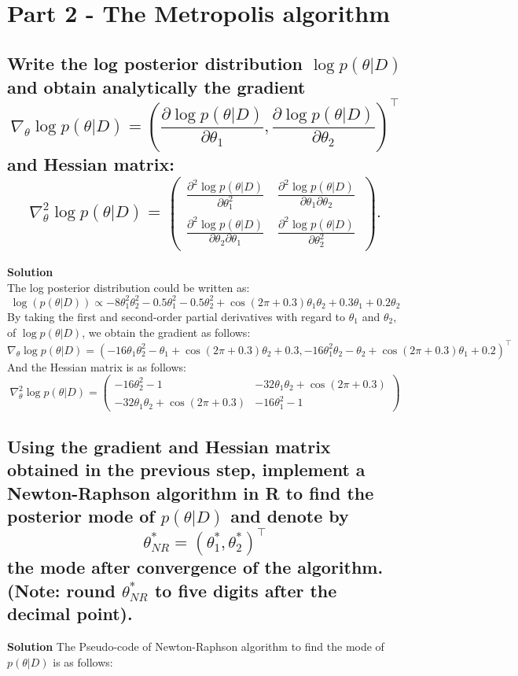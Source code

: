 \documentclass[12pt]{article}
\begin{document}
\section{Part 2 - The Metropolis algorithm}
\subsection{Write the log posterior distribution \( \log p(\theta|D) \) and obtain analytically the gradient
\[\nabla_\theta \log p(\theta|D) = \left( \frac{\partial \log p(\theta|D)}{\partial \theta_1}, \frac{\partial \log p(\theta|D)}{\partial \theta_2} \right)^\top \]
and Hessian matrix:
\[\nabla^2_\theta \log p(\theta|D) = 
\begin{pmatrix}
\frac{\partial^2 \log p(\theta|D)}{\partial \theta_1^2} & \frac{\partial^2 \log p(\theta|D)}{\partial \theta_1 \partial \theta_2} \\
\frac{\partial^2 \log p(\theta|D)}{\partial \theta_2 \partial \theta_1} & \frac{\partial^2 \log p(\theta|D)}{\partial \theta_2^2} 
\end{pmatrix}.\]}
\textbf{Solution}\\
The log posterior distribution could be written as:
\[
\log(p(\theta|D)) \propto -8\theta_1^2\theta_2^2 - 0.5\theta_1^2 - 0.5\theta_2^2 + \cos(2\pi + 0.3)\theta_1\theta_2 + 0.3\theta_1 + 0.2\theta_2
\]
By taking the first and second-order partial derivatives with regard to \(\theta_1\) and \(\theta_2\), of \(\log p(\theta|D)\),
we obtain the gradient as follows:
\[
\nabla_\theta \log p(\theta|D) = \left( -16\theta_1\theta_2^2 - \theta_1 + \cos(2\pi + 0.3)\theta_2 + 0.3, -16\theta_1^2\theta_2 - \theta_2 + \cos(2\pi + 0.3)\theta_1 + 0.2 \right)^\top
\]
And the Hessian matrix is as follows:
\[
\nabla^2_\theta \log p(\theta|D) = 
\begin{pmatrix}
-16\theta_2^2 - 1 & -32\theta_1\theta_2 + \cos(2\pi + 0.3) \\
-32\theta_1\theta_2 + \cos(2\pi + 0.3) & -16\theta_1^2 - 1
\end{pmatrix}
\]

\subsection{Using the gradient and Hessian matrix obtained in the previous step, implement a Newton-Raphson algorithm in R to find the posterior mode of \( p(\theta|D) \) and denote by
\[
\theta^*_{NR} = (\theta^*_1, \theta^*_2)^\top
\]
the mode after convergence of the algorithm. (Note: round \( \theta^*_{NR} \) to five digits after the decimal point).}
\textbf{Solution}
The Pseudo-code of Newton-Raphson algorithm to find the mode of \( p(\theta|D) \) is as follows:
\end{document}

